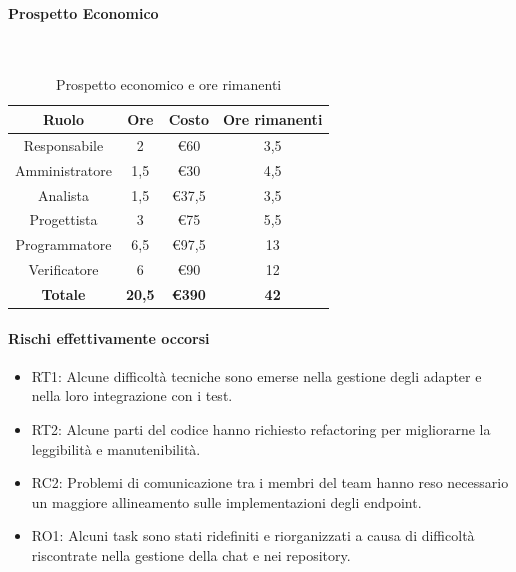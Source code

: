 \documentclass{article}
\begin{document}
            \paragraph{Prospetto Economico}\mbox{}\\
            \begin{table}[H]
                \centering
                \begin{tabular}{|c|c|c|c|}
                \hline
                \textbf{Ruolo}  & \textbf{Ore}  & \textbf{Costo}      & \textbf{Ore rimanenti}   \\ \hline
                Responsabile    & 2             & €60                 & 3,5                      \\ \hline
                Amministratore  & 1,5           & €30                 & 4,5                        \\ \hline
                Analista        & 1,5           & €37,5               & 3,5                      \\ \hline
                Progettista     & 3             & €75                 & 5,5                      \\ \hline
                Programmatore   & 6,5           & €97,5               & 13                       \\ \hline
                Verificatore    & 6             & €90                 & 12                        \\ \hline
                \textbf{Totale} & \textbf{20,5} & \textbf{\euro390}   & \textbf{42}            \\ \hline
                \end{tabular}
                \caption{Prospetto economico e ore rimanenti}
            \end{table}
            
            \paragraph{Rischi effettivamente occorsi}
            \begin{itemize}
                \item RT1: Alcune difficoltà tecniche sono emerse nella gestione degli adapter e nella loro integrazione con i test.
                \item RT2: Alcune parti del codice hanno richiesto refactoring per migliorarne la leggibilità e manutenibilità.
                \item RC2: Problemi di comunicazione tra i membri del team hanno reso necessario un maggiore allineamento sulle implementazioni degli endpoint.
                \item RO1: Alcuni task sono stati ridefiniti e riorganizzati a causa di difficoltà riscontrate nella gestione della chat e nei repository.
            \end{itemize}
            
\end{document}
